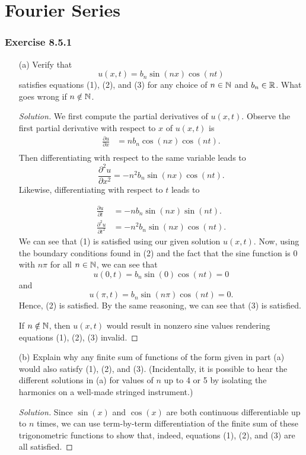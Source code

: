 \section{Fourier Series}

\subsubsection{Exercise 8.5.1} 
\begin{enumerate}
    \item[(a)] Verify that 
        \[  u(x,t) = b_{n} \sin(nx) \cos(nt) \] satisfies equations (1), (2), and (3) for any choice of \( n \in \mathbb{N}  \) and \( b_{n} \in \mathbb{R}  \). What goes wrong if \( n \notin \mathbb{N}  \).
        \begin{proof}[Solution]
        We first compute the partial derivatives of \( u(x,t)  \). Observe the first partial derivative with respect to \( x  \) of \( u(x,t) \) is 
        \begin{align*}
            \frac{\partial u }{\partial x } &= n b_{n} \cos(nx) \cos(nt). \\
        \end{align*}
        Then differentiating with respect to the same variable leads to 
        \[  \frac{\partial ^{2} u  }{\partial x^{2} } = - n^{2} b_{n} \sin(nx) \cos(nt).  \] 
        Likewise, differentiating with respect to \( t  \) leads to 

        \begin{align*}
            \frac{\partial u }{\partial t } &= -n b_{n} \sin(nx) \sin(nt). \\
            \frac{\partial ^{2} u  }{\partial  t^{2} } &= - n^{2} b_{n} \sin(nx) \cos(nt).
        \end{align*}
        We can see that (1) is satisfied using our given solution \( u(x,t) \).
        Now, using the boundary conditions found in (2) and the fact that the sine function is 0 with \( n \pi  \) for all \( n \in \mathbb{N}  \), we can see that 
        \[  u(0,t) =  b_{n} \sin(0) \cos(nt) = 0  \]
        and 
        \[  u(\pi, t ) = b_{n} \sin(n \pi ) \cos(nt) = 0. \] Hence, (2) is satisfied. By the same reasoning, we can see that (3) is satisfied.

        If \( n \notin \mathbb{N} \), then \( u(x,t)  \) would result in nonzero sine values rendering equations (1), (2), (3) invalid.
        \end{proof}
    \item[(b)] Explain why any finite sum of functions of the form given in part (a) would also satisfy (1), (2), and (3). (Incidentally, it is possible to hear the different solutions in (a) for values of \( n  \) up to 4 or 5 by isolating the harmonics on a well-made stringed instrument.)
        \begin{proof}[Solution]
        Since \( \sin(x) \) and \( \cos(x) \) are both continuous differentiable up to \( n  \) times, we can use term-by-term differentiation of the finite sum of these trigonometric functions to show that, indeed, equations (1), (2), and (3) are all satisfied.
        \end{proof}
\end{enumerate}


